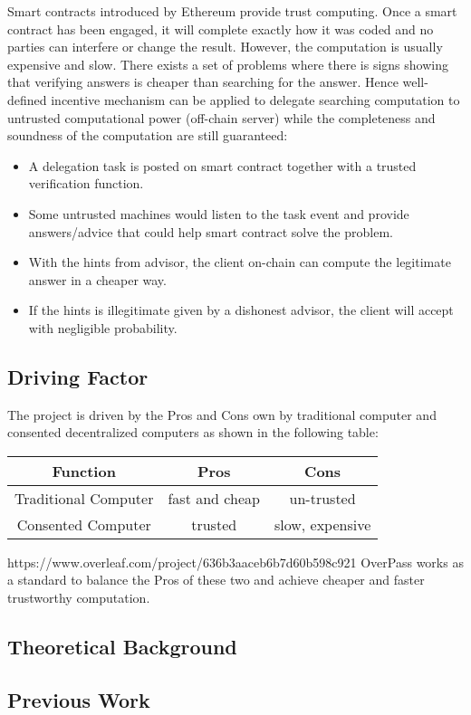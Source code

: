 Smart contracts introduced by Ethereum \cite{wood2014ethereum} provide trust computing. Once a smart contract has been engaged, it will complete exactly how it was coded and no parties can interfere or change the result. However, the computation is usually expensive and slow. There exists a set of problems where there is signs showing that verifying answers is cheaper than searching for the answer. Hence well-defined incentive mechanism can be applied to delegate searching computation to untrusted computational power (off-chain server) while the completeness and soundness of the computation are still guaranteed:
\begin{itemize}
    \item  A delegation task is posted on smart contract together with a trusted verification function.
    \item  Some untrusted machines would listen to the task event and provide answers/advice that could help smart contract solve the problem.
    \item With the hints from advisor, the client on-chain can compute the legitimate answer in a cheaper way.
    \item If the hints is illegitimate given by a dishonest advisor, the client will accept with negligible probability.
\end{itemize}

\subsection{Driving Factor}
The project is driven by the Pros and Cons own by traditional computer and consented decentralized computers as shown in the following table:
\begin{footnotesize}
\begin{table}[H]
\begin{tabular}{|c|c|c|}
\hline
Function             & Pros           & Cons            \\ \hline
Traditional Computer & fast and cheap & un-trusted      \\ \hline
Consented Computer   & trusted        & slow, expensive \\ \hline
\end{tabular}
\end{table}
\end{footnotesize}https://www.overleaf.com/project/636b3aaceb6b7d60b598c921
OverPass works as a standard to balance the Pros of these two and achieve cheaper and faster trustworthy computation.
\subsection{Theoretical Background} \label{theory}


\subsection{Previous Work} \label{ch:previous}

